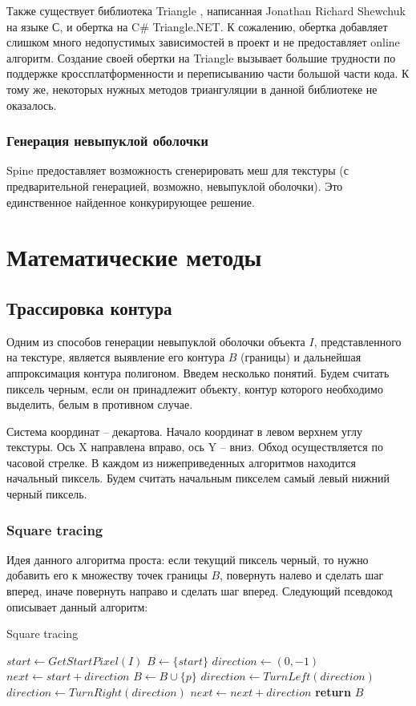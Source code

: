 \documentclass{fefu}
\newenvironment{algo}[1][]
  {\begin{algorithm}[#1]
     \selectlanguage{english}
     \floatname{algorithm}{Алгоритм}
  }
  {\end{algorithm}}
\begin{document}
Также существует библиотека Triangle \cite{TriangleSite}, написанная Jonathan Richard Shewchuk на языке С, и
обертка на C\# Triangle.NET. К сожалению, обертка добавляет слишком много недопустимых зависимостей в проект и не
предоставляет online алгоритм. Создание своей обертки на Triangle вызывает большие трудности по поддержке
кроссплатформенности и переписыванию части большой части кода. К тому же, некоторых нужных методов триангуляции в
данной библиотеке не оказалось.
\subsubsection{Генерация невыпуклой оболочки}
Spine предоставляет возможность сгенерировать меш для текстуры (с предварительной генерацией, возможно, невыпуклой оболочки).
Это единственное найденное конкурирующее решение.
\section{Математические методы}
\subsection{Трассировка контура}
Одним из способов генерации невыпуклой оболочки объекта $I$, представленного на текстуре, является выявление
его контура $B$ (границы) и дальнейшая аппроксимация контура полигоном. Введем несколько понятий. Будем считать пиксель 
черным, если он принадлежит объекту, контур которого необходимо выделить, белым в противном случае. 

Система координат -- декартова. Начало координат в левом верхнем углу текстуры. Ось X направлена вправо, ось Y -- вниз. 
Обход осуществляется по часовой стрелке. В каждом из нижеприведенных алгоритмов находится начальный пиксель. Будем 
считать начальным пикселем самый левый нижний черный пиксель.
\subsubsection{Square tracing}
Идея данного алгоритма проста: если текущий пиксель черный, то нужно добавить его к множеству точек границы $B$,
повернуть налево и сделать шаг вперед, иначе повернуть направо и сделать шаг вперед. Следующий псевдокод
описывает данный алгоритм:
\begin{algo}[H]
    \caption{Square tracing}
    \begin{algorithmic}[1]
         
            \State $start \gets GetStartPixel(I)$
            \State $B \gets \{start\}$
            \State $direction \gets \left(0, -1\right)$
            \State $next \gets start + direction$
                    \State $B \gets B \cup \{p\}$
                    \State $direction \gets TurnLeft(direction)$
                \Else
                    \State $direction \gets TurnRight(direction)$
                \EndIf
                \State $next \gets next + direction$
            \EndWhile
            \State \textbf{return} $B$
        \EndProcedure
    \end{algorithmic}
\end{algo}
\end{document}
